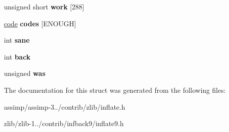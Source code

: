 \begin{DoxyCompactItemize}
\item 
\hypertarget{structinflate__state_a26883e050c93e44f1c45eadfb1ccaa93}{unsigned short {\bfseries work} \mbox{[}288\mbox{]}}\label{structinflate__state_a26883e050c93e44f1c45eadfb1ccaa93}

\item 
\hypertarget{structinflate__state_af6e7df6bff086c3b9cf2615367949277}{\hyperlink{structcode}{code} {\bfseries codes} \mbox{[}E\+N\+O\+U\+G\+H\mbox{]}}\label{structinflate__state_af6e7df6bff086c3b9cf2615367949277}

\item 
\hypertarget{structinflate__state_a98b40fe23b7177bc8cd1d9d73edad593}{int {\bfseries sane}}\label{structinflate__state_a98b40fe23b7177bc8cd1d9d73edad593}

\item 
\hypertarget{structinflate__state_ab666ce74a806fc77200ced9bc385cb0b}{int {\bfseries back}}\label{structinflate__state_ab666ce74a806fc77200ced9bc385cb0b}

\item 
\hypertarget{structinflate__state_a0e3af9175f6d3b30f83af69062ba4dec}{unsigned {\bfseries was}}\label{structinflate__state_a0e3af9175f6d3b30f83af69062ba4dec}

\end{DoxyCompactItemize}


The documentation for this struct was generated from the following files\+:\begin{DoxyCompactItemize}
\item 
assimp/assimp-\/3../contrib/zlib/inflate.\+h\item 
zlib/zlib-\/1../contrib/infback9/inflate9.\+h\end{DoxyCompactItemize}
